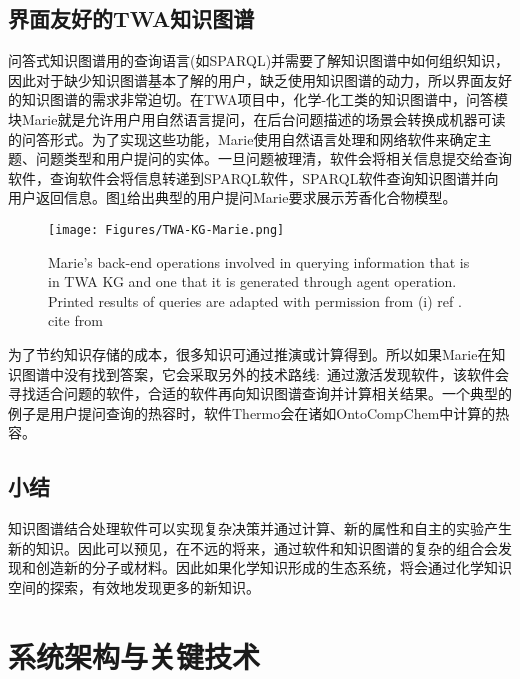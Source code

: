 \subsection{界面友好的\rm{TWA}知识图谱}
问答式知识图谱用的查询语言(如\textrm{SPARQL})并需要了解知识图谱中如何组织知识，因此对于缺少知识图谱基本了解的用户，缺乏使用知识图谱的动力，所以界面友好的知识图谱的需求非常迫切。在\textrm{TWA}项目中，化学-化工类的知识图谱中，问答模块\textrm{Marie}就是允许用户用自然语言提问，在后台问题描述的场景会转换成机器可读的问答形式。为了实现这些功能，\textrm{Marie}使用自然语言处理和网络软件来确定主题、问题类型和用户提问的实体。一旦问题被理清，软件会将相关信息提交给查询软件，查询软件会将信息转递到\textrm{SPARQL}软件，\textrm{SPARQL}软件查询知识图谱并向用户返回信息。图\ref{Fig:TWA-KG-Marie}给出典型的用户提问\textrm{Marie}要求展示芳香化合物模型。
\begin{figure}[h!]
\centering
\texttt{[image: Figures/TWA-KG-Marie.png]}
\caption{\small\textrm{Marie's back-end operations involved in querying information that is in TWA KG and one that it is generated through agent operation. Printed results of queries are adapted with permission from (i) ref \cite{JCIM61-3868_2021}. cite from ~\cite{ACR56-128_2023}}}%
\label{Fig:TWA-KG-Marie}
\end{figure}
为了节约知识存储的成本，很多知识可通过推演或计算得到。所以如果\textrm{Marie}在知识图谱中没有找到答案，它会采取另外的技术路线:~通过激活发现软件，该软件会寻找适合问题的软件，合适的软件再向知识图谱查询并计算相关结果。一个典型的例子是用户提问查询的热容时，软件\textrm{Thermo}会在诸如\textrm{OntoCompChem}中计算的热容。
\subsection{小结}
知识图谱结合处理软件可以实现复杂决策并通过计算、新的属性和自主的实验产生新的知识。因此可以预见，在不远的将来，通过软件和知识图谱的复杂的组合会发现和创造新的分子或材料。因此如果化学知识形成的生态系统，将会通过化学知识空间的探索，有效地发现更多的新知识。

\section{系统架构与关键技术}
